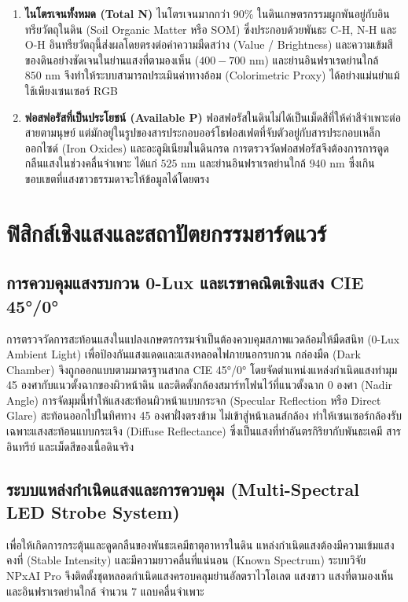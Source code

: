 \documentclass[12pt,a4paper,oneside]{book}
\begin{document}
\begin{enumerate}
    \item \textbf{ไนโตรเจนทั้งหมด (Total N)} ไนโตรเจนมากกว่า 90\% ในดินเกษตรกรรมผูกพันอยู่กับอินทรียวัตถุในดิน (Soil Organic Matter หรือ SOM) ซึ่งประกอบด้วยพันธะ C-H, N-H และ O-H อินทรียวัตถุนี้ส่งผลโดยตรงต่อค่าความมืดสว่าง (Value / Brightness) และความเข้มสีของดินอย่างชัดเจนในย่านแสงที่ตามองเห็น ($400 - 700\text{ nm}$) และย่านอินฟราเรดย่านใกล้ $850\text{ nm}$ จึงทำให้ระบบสามารถประเมินค่าทางอ้อม (Colorimetric Proxy) ได้อย่างแม่นยำแม้ใช้เพียงเซนเซอร์ RGB
    
    \item \textbf{ฟอสฟอรัสที่เป็นประโยชน์ (Available P)} ฟอสฟอรัสในดินไม่ได้เป็นเม็ดสีที่ให้ค่าสีจำเพาะต่อสายตามนุษย์ แต่มักอยู่ในรูปของสารประกอบออร์โธฟอสเฟตที่จับตัวอยู่กับสารประกอบเหล็กออกไซด์ (Iron Oxides) และอะลูมิเนียมในดินกรด การตรวจวัดฟอสฟอรัสจึงต้องการการดูดกลืนแสงในช่วงคลื่นจำเพาะ ได้แก่ $525\text{ nm}$ และย่านอินฟราเรดย่านใกล้ $940\text{ nm}$ ซึ่งเกินขอบเขตที่แสงขาวธรรมดาจะให้ข้อมูลได้โดยตรง
\end{enumerate}

\chapter{ฟิสิกส์เชิงแสงและสถาปัตยกรรมฮาร์ดแวร์}

\section{การควบคุมแสงรบกวน 0-Lux และเรขาคณิตเชิงแสง CIE 45°/0°}
การตรวจวัดการสะท้อนแสงในแปลงเกษตรกรรมจำเป็นต้องควบคุมสภาพแวดล้อมให้มืดสนิท (0-Lux Ambient Light) เพื่อป้องกันแสงแดดและแสงหลอดไฟภายนอกรบกวน กล่องมืด (Dark Chamber) จึงถูกออกแบบตามมาตรฐานสากล CIE 45°/0° โดยจัดตำแหน่งแหล่งกำเนิดแสงทำมุม 45 องศากับแนวตั้งฉากของผิวหน้าดิน และติดตั้งกล้องสมาร์ทโฟนไว้ที่แนวตั้งฉาก 0 องศา (Nadir Angle) การจัดมุมนี้ทำให้แสงสะท้อนผิวหน้าแบบกระจก (Specular Reflection หรือ Direct Glare) สะท้อนออกไปในทิศทาง 45 องศาฝั่งตรงข้าม ไม่เข้าสู่หน้าเลนส์กล้อง ทำให้เซนเซอร์กล้องรับเฉพาะแสงสะท้อนแบบกระเจิง (Diffuse Reflectance) ซึ่งเป็นแสงที่ทำอันตรกิริยากับพันธะเคมี สารอินทรีย์ และเม็ดสีของเนื้อดินจริง

\section{ระบบแหล่งกำเนิดแสงและการควบคุม (Multi-Spectral LED Strobe System)}
เพื่อให้เกิดการกระตุ้นและดูดกลืนของพันธะเคมีธาตุอาหารในดิน แหล่งกำเนิดแสงต้องมีความเข้มแสงคงที่ (Stable Intensity) และมีความยาวคลื่นที่แน่นอน (Known Spectrum) ระบบวิจัย NPxAI Pro จึงติดตั้งชุดหลอดกำเนิดแสงครอบคลุมย่านอัลตราไวโอเลต แสงขาว แสงที่ตามองเห็น และอินฟราเรดย่านใกล้ จำนวน 7 แถบคลื่นจำเพาะ
\end{document}
